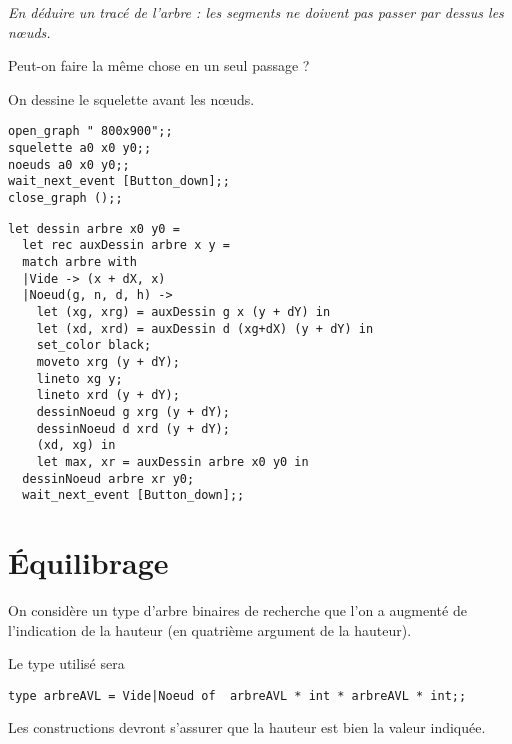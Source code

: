 \begin{Exercise}\it En déduire un tracé de l'arbre : les segments ne doivent pas passer par dessus les nœuds.

Peut-on faire la même chose en un seul passage ?
\end{Exercise}
\begin{Answer}
On dessine le squelette avant les nœuds.
\begin{lstlisting}
open_graph " 800x900";;
squelette a0 x0 y0;;
noeuds a0 x0 y0;;
wait_next_event [Button_down];;
close_graph ();;
\end{lstlisting}
\begin{lstlisting}
let dessin arbre x0 y0 = 
  let rec auxDessin arbre x y = 
  match arbre with
  |Vide -> (x + dX, x)
  |Noeud(g, n, d, h) -> 
    let (xg, xrg) = auxDessin g x (y + dY) in                     
    let (xd, xrd) = auxDessin d (xg+dX) (y + dY) in
    set_color black;
    moveto xrg (y + dY);
    lineto xg y;
    lineto xrd (y + dY);
    dessinNoeud g xrg (y + dY);
    dessinNoeud d xrd (y + dY);
    (xd, xg) in
    let max, xr = auxDessin arbre x0 y0 in 
  dessinNoeud arbre xr y0;
  wait_next_event [Button_down];;
\end{lstlisting}
\newpage
\end{Answer}
\section{Équilibrage}
On considère un type d'arbre binaires de recherche que l'on a augmenté de l'indication de la hauteur (en quatrième argument de la hauteur).

Le type utilisé sera 
\begin{lstlisting}
type arbreAVL = Vide|Noeud of  arbreAVL * int * arbreAVL * int;;
\end{lstlisting}

Les constructions devront s'assurer que la hauteur est bien la valeur indiquée.
